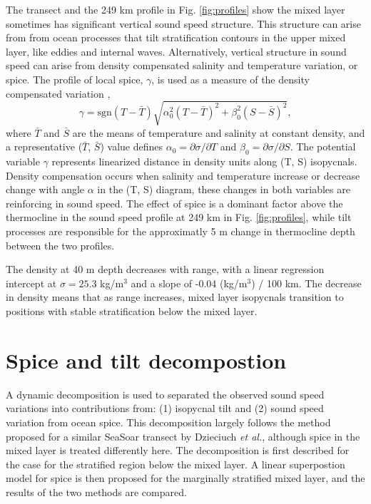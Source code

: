 \documentclass[preprint,NumberedRefs]{JASA}
\begin{document}
The transect and the 249 km profile in Fig. \ref{fig:profiles} show the mixed layer sometimes has significant vertical sound speed structure. This structure can arise from from ocean processes that tilt stratification contours in the upper mixed layer, like eddies and internal waves. Alternatively, vertical structure in sound speed can arise from density compensated salinity and temperature variation, or spice. The profile of local spice, $\gamma$, is used as a measure of the density compensated variation \citep{klymak2015spice},
\begin{equation}
    \gamma=\textrm{sgn}(T-\bar{T}) \sqrt{\alpha_0^2(T-\bar{T})^2 +\beta_0^2(S-\bar{S})^2},
    \label{eq:gamma}
\end{equation}
where $\bar{T}$ and $\bar{S}$ are the means of temperature and salinity at constant density, and a representative ($\bar{T}$, $\bar{S}$) value defines $\alpha_0=\partial \sigma / \partial T$ and $\beta_0=\partial \sigma / \partial S$. The potential variable $\gamma$ represents linearized distance in density units along (T, S) isopycnals. Density compensation occurs when salinity and temperature increase or decrease change with angle $\alpha$ in the (T, S) diagram, these changes in both variables are reinforcing in sound speed. The effect of spice is a dominant factor above the thermocline in the sound speed profile at 249 km in Fig. \ref{fig:profiles}, while tilt processes are responsible for the approximatly 5 m change in thermocline depth between the two profiles.

The density at 40 m depth decreases with range, with a linear regression intercept at $\sigma=25.3$ kg/m$^3$ and a slope of -0.04 (kg/m$^3$) / 100 km. The decrease in density means that as range increases, mixed layer isopycnals transition to positions with stable stratification below the mixed layer.

\section{\label{sec:decomposition}Spice and tilt decompostion}
A dynamic decomposition is used to separated the observed sound speed variations into contributions from: (1) isopycnal tilt and (2) sound speed variation from ocean spice. This decomposition largely follows the method proposed for a similar SeaSoar transect by Dzieciuch \emph{et al.}\citep{dzieciuch2004}, although spice in the mixed layer is treated differently here. The decomposition is first described for the case for the stratified region below the mixed layer. A linear superpostion model for spice is then proposed for the marginally stratified mixed layer, and the results of the two methods are compared.
\end{document}

